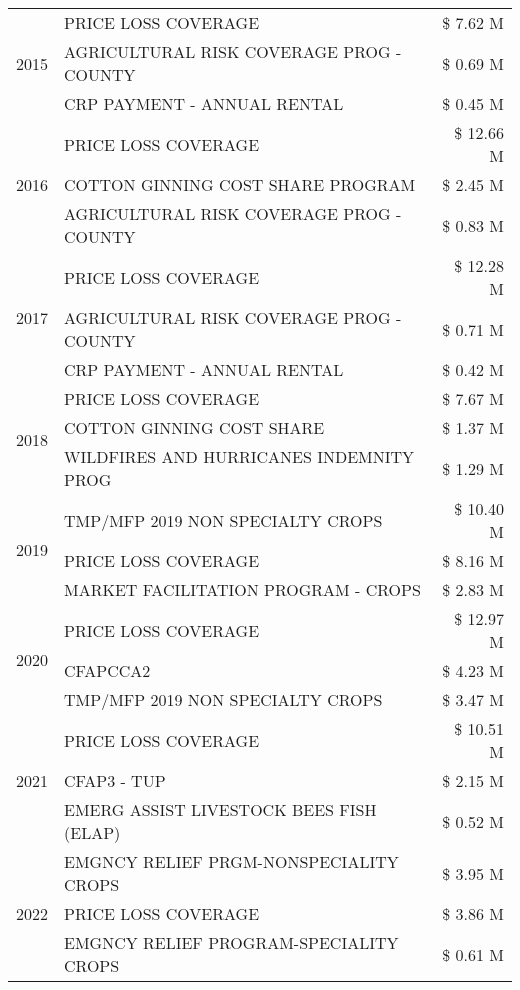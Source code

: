 \begin{tabular}{llr}
\cline{1-3}
\multirow[t]{3}{*}{2015} & PRICE LOSS COVERAGE & \$ 7.62 M \\
 & AGRICULTURAL RISK COVERAGE PROG - COUNTY & \$ 0.69 M \\
 & CRP PAYMENT - ANNUAL RENTAL & \$ 0.45 M \\
\cline{1-3}
\multirow[t]{3}{*}{2016} & PRICE LOSS COVERAGE & \$ 12.66 M \\
 & COTTON GINNING COST SHARE PROGRAM & \$ 2.45 M \\
 & AGRICULTURAL RISK COVERAGE PROG - COUNTY & \$ 0.83 M \\
\cline{1-3}
\multirow[t]{3}{*}{2017} & PRICE LOSS COVERAGE & \$ 12.28 M \\
 & AGRICULTURAL RISK COVERAGE PROG - COUNTY & \$ 0.71 M \\
 & CRP PAYMENT - ANNUAL RENTAL & \$ 0.42 M \\
\cline{1-3}
\multirow[t]{3}{*}{2018} & PRICE LOSS COVERAGE & \$ 7.67 M \\
 & COTTON GINNING COST SHARE & \$ 1.37 M \\
 & WILDFIRES AND HURRICANES INDEMNITY PROG & \$ 1.29 M \\
\cline{1-3}
\multirow[t]{3}{*}{2019} & TMP/MFP 2019 NON SPECIALTY CROPS & \$ 10.40 M \\
 & PRICE LOSS COVERAGE & \$ 8.16 M \\
 & MARKET FACILITATION PROGRAM - CROPS & \$ 2.83 M \\
\cline{1-3}
\multirow[t]{3}{*}{2020} & PRICE LOSS COVERAGE & \$ 12.97 M \\
 & CFAPCCA2 & \$ 4.23 M \\
 & TMP/MFP 2019 NON SPECIALTY CROPS & \$ 3.47 M \\
\cline{1-3}
\multirow[t]{3}{*}{2021} & PRICE LOSS COVERAGE & \$ 10.51 M \\
 & CFAP3 - TUP & \$ 2.15 M \\
 & EMERG ASSIST LIVESTOCK BEES FISH (ELAP) & \$ 0.52 M \\
\cline{1-3}
\multirow[t]{3}{*}{2022} & EMGNCY RELIEF PRGM-NONSPECIALITY CROPS & \$ 3.95 M \\
 & PRICE LOSS COVERAGE & \$ 3.86 M \\
 & EMGNCY RELIEF PROGRAM-SPECIALITY CROPS & \$ 0.61 M \\
\cline{1-3}
\bottomrule
\end{tabular}
